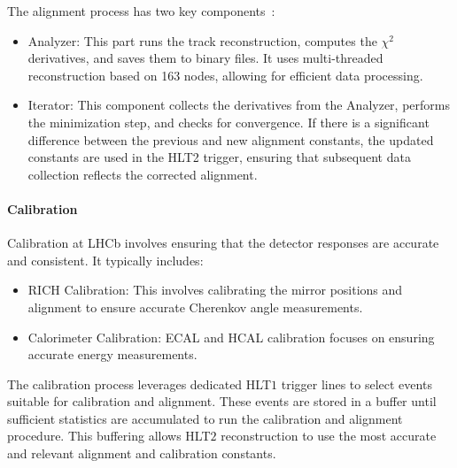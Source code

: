 The alignment process has two key components~\cite{Saur:20230E}:
\begin{itemize}
\item Analyzer: This part runs the track reconstruction, computes the $\chi^2$ derivatives, and saves them to binary files. It uses multi-threaded reconstruction based on 163 nodes, allowing for efficient data processing.
\item Iterator: This component collects the derivatives from the Analyzer, performs the minimization step, and checks for convergence. If there is a significant difference between the previous and new alignment constants, the updated constants are used in the HLT2 trigger, ensuring that subsequent data collection reflects the corrected alignment.
\end{itemize}
\paragraph{Calibration}
Calibration at LHCb involves ensuring that the detector responses are accurate and consistent. It typically includes:
\begin{itemize}
\item RICH Calibration: This involves calibrating the mirror positions and alignment to ensure accurate Cherenkov angle measurements.
\item Calorimeter Calibration: ECAL and HCAL calibration focuses on ensuring accurate energy measurements.
\end{itemize}
The calibration process leverages dedicated HLT$1$ trigger lines to select events suitable for calibration and alignment. These events are stored in a buffer until sufficient statistics are accumulated to run the calibration and alignment procedure. This buffering allows HLT$2$ reconstruction to use the most accurate and relevant alignment and calibration constants.


